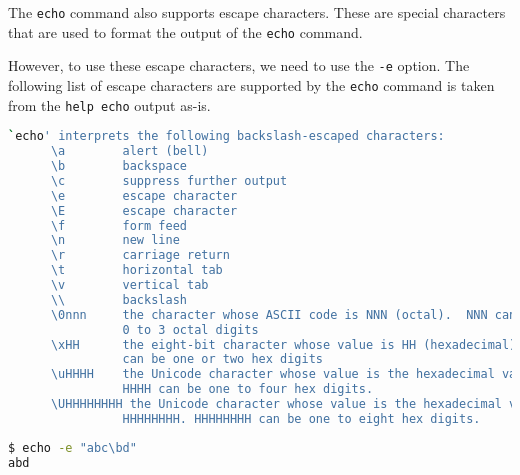 The \lstinline{echo} command also supports escape characters. These are special characters that are used to format the output of the \lstinline{echo} command.

However, to use these escape characters, we need to use the \lstinline{-e} option.
The following list of escape characters are supported by the \lstinline{echo} command is taken from the \lstinline{help echo} output as-is.

\begin{lstlisting}[language=bash]
`echo' interprets the following backslash-escaped characters:
      \a        alert (bell)
      \b        backspace
      \c        suppress further output
      \e        escape character
      \E        escape character
      \f        form feed
      \n        new line
      \r        carriage return
      \t        horizontal tab
      \v        vertical tab
      \\        backslash
      \0nnn     the character whose ASCII code is NNN (octal).  NNN can be
                0 to 3 octal digits
      \xHH      the eight-bit character whose value is HH (hexadecimal).  HH
                can be one or two hex digits
      \uHHHH    the Unicode character whose value is the hexadecimal value HHHH.
                HHHH can be one to four hex digits.
      \UHHHHHHHH the Unicode character whose value is the hexadecimal value
                HHHHHHHH. HHHHHHHH can be one to eight hex digits.
\end{lstlisting}

\begin{lstlisting}[language=bash]
$ echo -e "abc\bd"
abd
\end{lstlisting}

